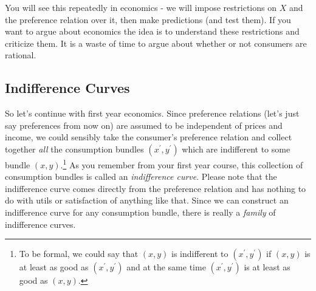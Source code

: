 \documentclass[12pt]{article}
\begin{document}
You will see this repeatedly in economics - we will impose restrictions on $X$
and the preference relation over it, then make predictions (and test them). If
you want to argue about economics the idea is to understand these restrictions
and criticize them. It is a waste of time to argue about whether or not
consumers are rational.

\subsection{Indifference Curves}

So let's continue with first year economics. Since preference relations (let's 
just say preferences from now on) are assumed to be independent of prices and
income, we could sensibly take the consumer's preference relation and collect
together \emph{all }the consumption bundles $\left(  x^{\prime},y^{\prime
}\right)  $ which are indifferent to some bundle $\left(  x,y\right)
$.\footnote{To be formal, we could say that $\left(  x,y\right)  $ is
indifferent to $\left(  x^{\prime},y^{\prime}\right)  $ if $\left(
x,y\right)  $ is at least as good as $\left(  x^{\prime},y^{\prime}\right)  $
and at the same time $\left(  x^{\prime},y^{\prime}\right)  $ is at least as
good as $\left(  x,y\right)  $.} As you remember from your first year course,
this collection of consumption bundles is called an \emph{indifference curve}.
Please note that the indifference curve comes directly from the preference
relation and has nothing to do with utils or satisfaction of anything like
that. Since we can construct an indifference curve for any consumption bundle,
there is really a \emph{family} of indifference curves. 
\end{document}
